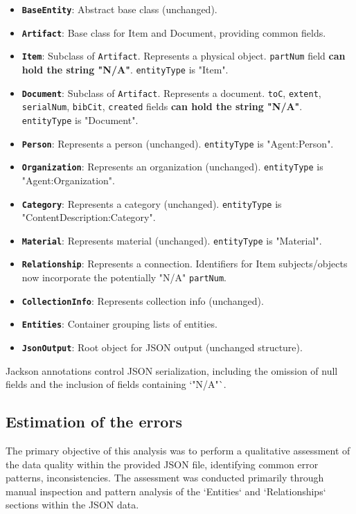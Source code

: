 \begin{itemize}
    \item \textbf{\texttt{BaseEntity}}: Abstract base class (unchanged).
    \item \textbf{\texttt{Artifact}}: Base class for Item and Document, providing common fields.
    \item \textbf{\texttt{Item}}: Subclass of \texttt{Artifact}. Represents a physical object. \texttt{partNum} field \textbf{can hold the string "N/A"}. \texttt{entityType} is "Item".
    \item \textbf{\texttt{Document}}: Subclass of \texttt{Artifact}. Represents a document. \texttt{toC}, \texttt{extent}, \texttt{serialNum}, \texttt{bibCit}, \texttt{created} fields \textbf{can hold the string "N/A"}. \texttt{entityType} is "Document".
    \item \textbf{\texttt{Person}}: Represents a person (unchanged). \texttt{entityType} is "Agent:Person".
    \item \textbf{\texttt{Organization}}: Represents an organization (unchanged). \texttt{entityType} is "Agent:Organization".
    \item \textbf{\texttt{Category}}: Represents a category (unchanged). \texttt{entityType} is "ContentDescription:Category".
    \item \textbf{\texttt{Material}}: Represents material (unchanged). \texttt{entityType} is "Material".
    \item \textbf{\texttt{Relationship}}: Represents a connection. Identifiers for Item subjects/objects now incorporate the potentially "N/A" \texttt{partNum}.
    \item \textbf{\texttt{CollectionInfo}}: Represents collection info (unchanged).
    \item \textbf{\texttt{Entities}}: Container grouping lists of entities.
    \item \textbf{\texttt{JsonOutput}}: Root object for JSON output (unchanged structure).
\end{itemize}
Jackson annotations control JSON serialization, including the omission of null fields and the inclusion of fields containing `"N/A"`.


\subsection{Estimation of the errors}
The primary objective of this analysis was to perform a qualitative assessment of the data quality within the provided JSON file, identifying common error patterns, inconsistencies.
\newline
The assessment was conducted primarily through manual inspection and pattern analysis of the `Entities` and `Relationships` sections within the JSON data.

